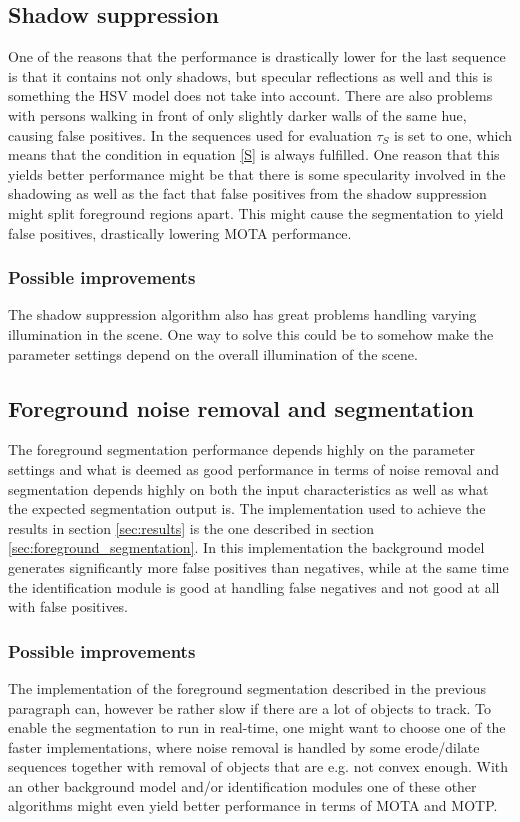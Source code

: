 


\subsection{Shadow suppression}
One of the reasons that the performance is drastically lower for the last sequence is that it contains not only shadows, but specular reflections as well and this is something the HSV model does not take into account. There are also problems with persons walking in front of only slightly darker walls of the same hue, causing false positives. In the sequences used for evaluation $\tau_S$ is set to one, which means that the condition in equation \eqref{S} is always fulfilled. One reason that this yields better performance might be that there is some specularity involved in the shadowing as well as the fact that false positives from the shadow suppression might split foreground regions apart. This might cause the segmentation to yield false positives, drastically lowering MOTA performance.

\subsubsection{Possible improvements}
The shadow suppression algorithm also has great problems handling varying illumination in the scene. One way to solve this could be to somehow make the parameter settings depend on the overall illumination of the scene. 

\subsection{Foreground noise removal and segmentation}
The foreground segmentation performance depends highly on the parameter settings and what is deemed as good performance in terms of noise removal and segmentation depends highly on both the input characteristics as well as what the expected segmentation output is. The implementation used to achieve the results in section \ref{sec:results}  is the one  described in section \ref{sec:foreground_segmentation}. In this implementation the background model generates significantly more false positives than negatives, while at the same time the identification module is good at handling false negatives and not good at all with false positives. 

\subsubsection{Possible improvements}
The implementation of the foreground segmentation described in the previous paragraph can, however be rather slow if there are a lot of objects to track. To enable the segmentation to run in real-time, one might want to choose one of the faster implementations, where noise removal is handled by some erode/dilate sequences together with removal of objects that are e.g. not convex enough. With an other background model and/or identification modules one of these other algorithms might even yield better performance in terms of MOTA and MOTP.

